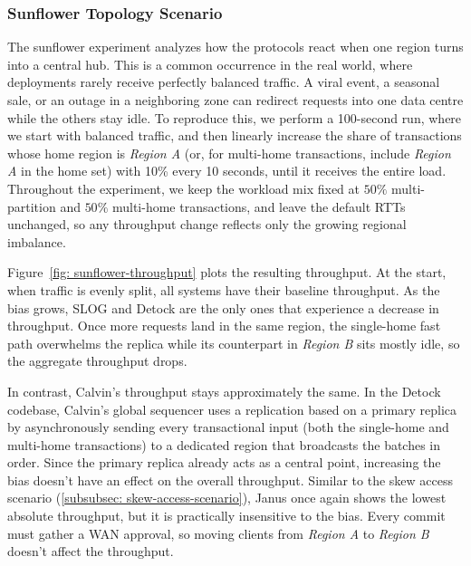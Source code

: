 \subsubsection{Sunflower Topology Scenario}
\label{subsubsec: sunflower-topology-scenario}
The sunflower experiment analyzes how the protocols react when one region turns into a central hub. This is a common occurrence in the real world, where deployments rarely receive perfectly balanced traffic. A viral event, a seasonal sale, or an outage in a neighboring zone can redirect requests into one data centre while the others stay idle. To reproduce this, we perform a 100-second run, where we start with balanced traffic, and then linearly increase the share of transactions whose home region is \textit{Region A} (or, for multi-home transactions, include \textit{Region A} in the home set) with 10\% every 10 seconds, until it receives the entire load. Throughout the experiment, we keep the workload mix fixed at $50\%$ multi-partition and $50\%$ multi-home transactions, and leave the default RTTs unchanged, so any throughput change reflects only the growing regional imbalance.

Figure~\ref{fig: sunflower-throughput} plots the resulting throughput. At the start, when traffic is evenly split, all systems have their baseline throughput. As the bias grows, SLOG and Detock are the only ones that experience a decrease in throughput. Once more requests land in the same region, the single-home fast path overwhelms the replica while its counterpart in \textit{Region B} sits mostly idle, so the aggregate throughput drops.

In contrast, Calvin's throughput stays approximately the same. In the Detock codebase, Calvin's global sequencer uses a replication based on a primary replica by asynchronously sending every transactional input (both the single-home and multi-home transactions) to a dedicated region that broadcasts the batches in order. Since the primary replica already acts as a central point, increasing the bias doesn't have an effect on the overall throughput. Similar to the skew access scenario (\ref{subsubsec: skew-access-scenario}), Janus once again shows the lowest absolute throughput, but it is practically insensitive to the bias. Every commit must gather a WAN approval, so moving clients from \textit{Region A} to \textit{Region B} doesn't affect the throughput.

